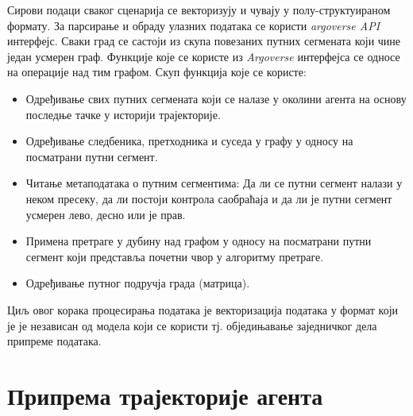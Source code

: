 \documentclass[11pt,oneside]{memoir}
\begin{document}
Сирови подаци сваког сценарија се векторизују и чувају у полу-структуираном формату. 
За парсирање и обраду улазних података се користи \textit{argoverse API} интерфејс. Сваки град се састоји из скупа
повезаних путних сегмената који чине један усмерен граф. Функције које се користе из \textit{Argoverse} интерфејса се 
односе на операције над тим графом. Скуп функција које се користе:
\begin{itemize}
  \item Одређивање свих путних сегмената који се налазе у околини агента на основу последње тачке у историји трајекторије.
  \item Одређивање следбеника, претходника и суседа у графу у односу на посматрани путни сегмент.
  \item Читање метаподатака о путним сегментима: Да ли се путни сегмент налази у неком пресеку, да ли постоји контрола саобраћаја и
        да ли је путни сегмент усмерен лево, десно или је прав.
  \item Примена претраге у дубину над графом у односу на посматрани путни сегмент који представља почетни чвор у алгоритму претраге.
  \item Одређивање путног подручја града (матрица).
\end{itemize}

Циљ овог корака процесирања података је векторизација података у формат који је је независан од модела који се користи тј.
обједињавање заједничког дела припреме података.

\section{Припрема трајекторије агента}
\end{document}
